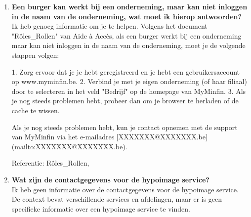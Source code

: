 \begin{enumerate}
    \item \textbf{Een burger kan werkt bij een onderneming, maar kan niet inloggen in de naam van de onderneming, wat moet ik hierop antwoorden?} \\
    
    Ik heb genoeg informatie om je te helpen. Volgens het document "Rôles\_Rollen" van Aide à Accès, als een burger werkt bij een onderneming maar kan niet inloggen in de naam van de onderneming, moet je de volgende stappen volgen:
    
    1. Zorg ervoor dat je je hebt geregistreerd en je hebt een gebruikersaccount op www.myminfin.be.
    2. Verbind je met je eigen onderneming (of haar filiaal) door te selecteren in het veld "Bedrijf" op de homepage van MyMinfin.
    3. Als je nog steeds problemen hebt, probeer dan om je browser te herladen of de cache te wissen.
    
    Als je nog steeds problemen hebt, kun je contact opnemen met de support van MyMinfin via het e-mailadres [XXXXXXX@XXXXXXX.be]\\
    (mailto:XXXXXXX@XXXXXXX.be).
    
    Referentie: Rôles\_Rollen,
    
    \item \textbf{Wat zijn de contactgegevens voor de hypoimage service?} \\
    Ik heb geen informatie over de contactgegevens voor de hypoimage service. De context bevat verschillende services en afdelingen, maar er is geen specifieke informatie over een hypoimage service te vinden.
\end{enumerate}